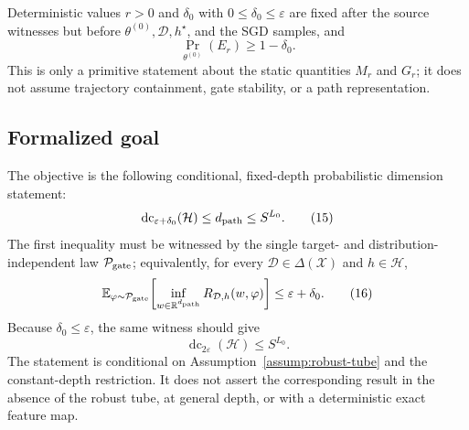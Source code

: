 \begin{assumption}
\label{assump:robust-tube}
Deterministic values $r>0$ and $\delta_0$ with
$0\leq\delta_0\leq\varepsilon$ are fixed after the source witnesses but
before $\theta^{(0)},\mathcal D,h^\star$, and the SGD samples, and
\[
\Pr_{\theta^{(0)}}(E_r)\geq1-\delta_0.
\tag{14}
\]
This is only a primitive statement about the static quantities $M_r$ and
$G_r$; it does not assume trajectory containment, gate stability, or a path
representation.
\end{assumption}

\subsection{Formalized goal}

The objective is the following conditional, fixed-depth probabilistic
dimension statement:
\[
\operatorname{dc}_{\varepsilon+\delta_0}(\mathcal H)
\leq d_{\rm path}\leq S^{L_0}.
\tag{15}
\]
The first inequality must be witnessed by the single target- and
distribution-independent law $\mathcal P_{\rm gate}$; equivalently, for every
$\mathcal D\in\Delta(\mathcal X)$ and $h\in\mathcal H$,
\[
\mathbb E_{\varphi\sim\mathcal P_{\rm gate}}\!\left[
\inf_{w\in\mathbb R^{d_{\rm path}}}
R_{\mathcal D,h}(w,\varphi)
\right]\leq\varepsilon+\delta_0.
\tag{16}
\]
Because $\delta_0\leq\varepsilon$, the same witness should give
\[
\operatorname{dc}_{2\varepsilon}(\mathcal H)\leq S^{L_0}.
\tag{17}
\]
The statement is conditional on Assumption~\ref{assump:robust-tube} and the
constant-depth restriction.  It does not assert the corresponding result in
the absence of the robust tube, at general depth, or with a deterministic
exact feature map.
